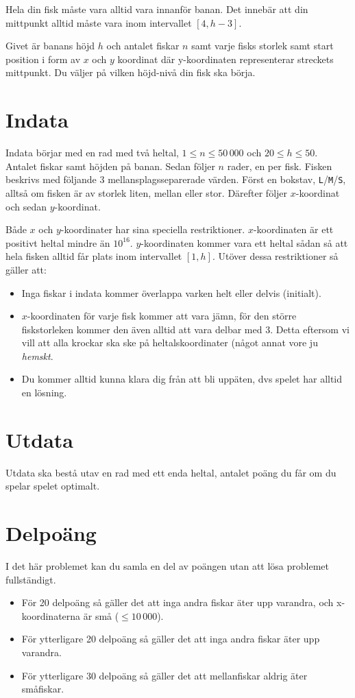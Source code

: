 Hela din fisk måste vara alltid vara innanför banan. Det innebär att
din mittpunkt alltid måste vara inom intervallet $[4, h-3]$.

Givet är banans höjd $h$ och antalet fiskar $n$ samt
varje fisks storlek samt start position i form av $x$ och $y$ koordinat där y-koordinaten
representerar streckets mittpunkt. Du väljer på vilken höjd-nivå din fisk ska börja.

\section*{Indata}

Indata börjar med en rad med två heltal, $1 \leq n \leq 50\,000$ och $20 \leq
h \leq 50$. Antalet fiskar samt höjden på banan. Sedan följer $n$ rader,
en per fisk. Fisken beskrivs med följande 3 mellansplagsseparerade värden.
Först en bokstav, \texttt{L}/\texttt{M}/\texttt{S}, alltså om fisken är av
storlek liten, mellan eller stor. Därefter följer $x$-koordinat och sedan
$y$-koordinat.

Både $x$ och $y$-koordinater har sina speciella restriktioner. $x$-koordinaten
är ett positivt heltal mindre än $10^{16}$. $y$-koordinaten kommer vara ett
heltal sådan så att hela fisken alltid får plats inom intervallet $[1, h]$.
Utöver dessa restriktioner så gäller att:

\begin{itemize}
  \item
    Inga fiskar i indata kommer överlappa varken helt eller delvis (initialt).
  \item
      $x$-koordinaten för varje fisk kommer att vara jämn, för den större
      fiskstorleken kommer den även alltid att vara delbar med 3. Detta
      eftersom vi vill att alla krockar ska ske på heltalskoordinater (något
      annat vore ju \emph{hemskt}.
  \item
    Du kommer alltid kunna klara dig från att bli uppäten, dvs spelet har
    alltid en lösning.
\end{itemize}

\section*{Utdata}
Utdata ska bestå utav en rad med ett enda heltal, antalet poäng du får om du spelar spelet optimalt.

\section*{Delpoäng}
I det här problemet kan du samla en del av poängen utan att lösa problemet fullständigt.

\begin{itemize}
    \item För 20 delpoäng så gäller det att inga andra fiskar äter upp
          varandra, och x-koordinaterna är små ($\leq 10\,000$).
    \item För ytterligare 20 delpoäng så gäller det att inga andra fiskar
          äter upp varandra.
    \item För ytterligare 30 delpoäng så gäller det att mellanfiskar aldrig
          äter småfiskar.
\end{itemize}
